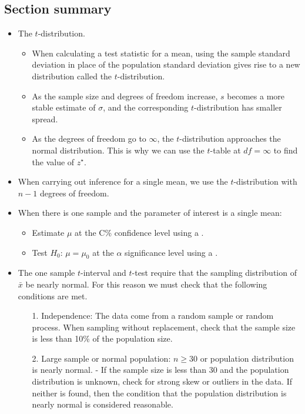 \subsection*{Section summary}
\begin{itemize} 
\item The $t$-distribution.\vspace{-1mm}
\begin{itemize}
\setlength{\itemsep}{0mm}
\item When calculating a test statistic for a mean, using the sample standard deviation in place of the population standard deviation gives rise to a new distribution called the $t$-distribution.  

\item As the sample size and degrees of freedom increase, $s$ becomes a more stable estimate of $\sigma$, and the corresponding $t$-distribution has smaller spread.  

\item As the degrees of freedom go to $\infty$, the $t$-distribution approaches the normal distribution.  This is why we can use the $t$-table at $df=\infty$ to find the value of $z^{\star}$.
\end{itemize}

\item When carrying out inference for a single mean, we use the $t$-distribution with $n-1$ degrees of freedom.

\item When there is one sample and the parameter of interest is a single mean:
\begin{itemize}
\item Estimate $\mu$ at the C\% confidence level using a .
\item Test $H_0$: $\mu=\mu_0$ at the $\alpha$ significance level using a . 
\end{itemize}

\item The one sample $t$-interval and $t$-test require that the sampling distribution of $\bar{x}$ be nearly normal.  For this reason we must check that the following conditions are met.
\begin{itemize}
\item[1.] Independence:  The data come from a random sample or random process.  When sampling without replacement, check that the sample size is less than 10\% of the population size.
\item[2.]  Large sample or normal population: $n\ge 30$ or population distribution is nearly normal. 
- If the sample size is less than 30 and the population distribution is unknown, check for strong skew or outliers in the data.  If neither is found, then the condition that the population distribution is nearly normal is considered reasonable.
\end{itemize}


\end{itemize}

